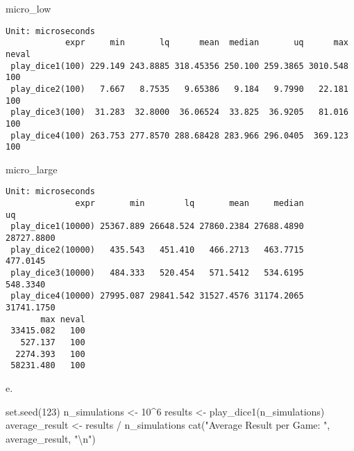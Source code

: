 \documentclass[
  letterpaper,
  DIV=11,
  numbers=noendperiod]{scrartcl}
\newenvironment{Shaded}{\begin{snugshade}}{\end{snugshade}}
\newcommand{\DecValTok}[1]{\textcolor[rgb]{0.68,0.00,0.00}{#1}}
\newcommand{\FunctionTok}[1]{\textcolor[rgb]{0.28,0.35,0.67}{#1}}
\newcommand{\NormalTok}[1]{\textcolor[rgb]{0.00,0.23,0.31}{#1}}
\newcommand{\OtherTok}[1]{\textcolor[rgb]{0.00,0.23,0.31}{#1}}
\newcommand{\SpecialCharTok}[1]{\textcolor[rgb]{0.37,0.37,0.37}{#1}}
\newcommand{\StringTok}[1]{\textcolor[rgb]{0.13,0.47,0.30}{#1}}
\begin{document}
\begin{Shaded}
\begin{Highlighting}[]
\NormalTok{micro\_low}
\end{Highlighting}
\end{Shaded}

\begin{verbatim}
Unit: microseconds
            expr     min       lq      mean  median       uq      max neval
 play_dice1(100) 229.149 243.8885 318.45356 250.100 259.3865 3010.548   100
 play_dice2(100)   7.667   8.7535   9.65386   9.184   9.7990   22.181   100
 play_dice3(100)  31.283  32.8000  36.06524  33.825  36.9205   81.016   100
 play_dice4(100) 263.753 277.8570 288.68428 283.966 296.0405  369.123   100
\end{verbatim}

\begin{Shaded}
\begin{Highlighting}[]
\NormalTok{micro\_large}
\end{Highlighting}
\end{Shaded}

\begin{verbatim}
Unit: microseconds
              expr       min        lq       mean     median         uq
 play_dice1(10000) 25367.889 26648.524 27860.2384 27688.4890 28727.8800
 play_dice2(10000)   435.543   451.410   466.2713   463.7715   477.0145
 play_dice3(10000)   484.333   520.454   571.5412   534.6195   548.3340
 play_dice4(10000) 27995.087 29841.542 31527.4576 31174.2065 31741.1750
       max neval
 33415.082   100
   527.137   100
  2274.393   100
 58231.480   100
\end{verbatim}

e.

\begin{Shaded}
\begin{Highlighting}[]
\FunctionTok{set.seed}\NormalTok{(}\DecValTok{123}\NormalTok{)}
\NormalTok{n\_simulations }\OtherTok{\textless{}{-}} \DecValTok{10}\SpecialCharTok{\^{}}\DecValTok{6}
\NormalTok{results }\OtherTok{\textless{}{-}} \FunctionTok{play\_dice1}\NormalTok{(n\_simulations)}
\NormalTok{average\_result }\OtherTok{\textless{}{-}}\NormalTok{ results }\SpecialCharTok{/}\NormalTok{ n\_simulations}
\FunctionTok{cat}\NormalTok{(}\StringTok{"Average Result per Game: "}\NormalTok{, average\_result, }\StringTok{"}\SpecialCharTok{\textbackslash{}n}\StringTok{"}\NormalTok{)}
\end{Highlighting}
\end{Shaded}
\end{document}
